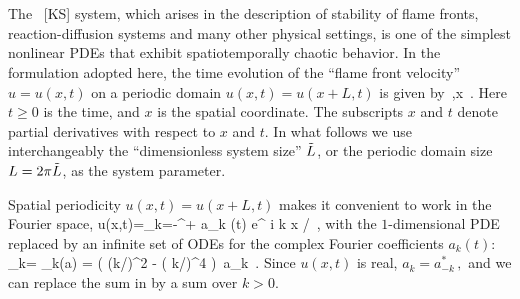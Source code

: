 

\section{\KSe}
\label{s-KS}


The \KS\ [KS] system, which arises in the description of
stability of flame fronts, reaction-diffusion systems and many other
physical settings, is one of the simplest nonlinear PDEs that
exhibit spatiotemporally chaotic behavior. In the formulation
adopted here, the time evolution of the ``flame front velocity''
$u=u(x,t)$ on a periodic domain $u(x,t) = u(x+L,t)$ is given by
\beq
{}
    \,,\qquad   x \in [0,L]
    \,.
Here $t \geq 0$ is the time, and $x$ is the spatial coordinate.
The subscripts $x$ and $t$ denote partial derivatives with respect to
$x$ and $t$. In what follows we use interchangeably the ``dimensionless
system size'' $\tilde{L}$, or the periodic domain size $L= 2\pi \tilde{L}$,
as the system parameter.

Spatial periodicity $u(x,t)=u(x+L,t)$
makes it convenient to work in the Fourier space,
\beq
  u(x,t)=\sum_{k=-\infty}^{+\infty} a_k (t) e^{ i k x /\tildeL }
\,,
with the $1$-dimensional PDE 
replaced by an infinite set of
ODEs for the complex Fourier coefficients $a_k(t)$:
\beq
{}_k= \pVeloc_k(a)
     = ( (k/\tildeL)^2 - ( k/\tildeL)^4 )\, a_k
\,.
Since $u(x,t)$ is real,
$ %
a_k=a_{-k}^*
\,,
$ %
and we can replace the sum in  by a
sum over $k > 0$.


